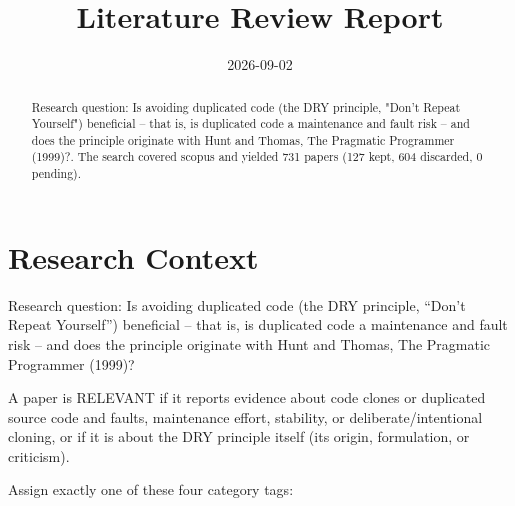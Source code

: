 \documentclass{article}
\title{Literature Review Report}
\date{2026-09-02}
\begin{document}
\maketitle

\begin{abstract}
Research question: Is avoiding duplicated code (the DRY principle, "Don't Repeat Yourself") beneficial -- that is, is duplicated code a maintenance and fault risk -- and does the principle originate with Hunt and Thomas, The Pragmatic Programmer (1999)?. The search covered scopus and yielded 731 papers (127 kept, 604 discarded, 0 pending).
\end{abstract}
\clearpage
\clearpage
\tableofcontents
\clearpage

\section{Research Context}
Research question: Is avoiding duplicated code (the DRY principle,
``Don't Repeat Yourself'') beneficial -- that is, is duplicated code a
maintenance and fault risk -- and does the principle originate with Hunt
and Thomas, The Pragmatic Programmer (1999)?

A paper is RELEVANT if it reports evidence about code clones or
duplicated source code and faults, maintenance effort, stability, or
deliberate/intentional cloning, or if it is about the DRY principle
itself (its origin, formulation, or criticism).

Assign exactly one of these four category tags:
\end{document}

